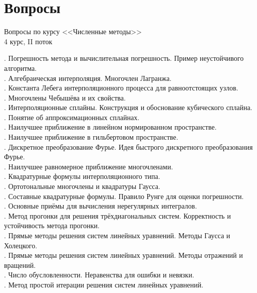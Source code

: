 \documentclass[specialist, subf, href, colorlinks=true, 12pt, times, mtpro, final]{disser}
\theoremstyle{definition}
\begin{document}
\tableofcontents

\section* {Вопросы}
\begin{center}
    Вопросы по курсу <<Численные методы>> \\ 4 курс, II поток
\end{center}
{\small
{}. Погрешность метода и вычислительная погрешность. Пример неустойчивого алгоритма.\\
. Алгебраическая интерполяция. Многочлен Лагранжа.\\
. Константа Лебега интерполяционного процесса для равноотстоящих узлов.\\
. Многочлены Чебышёва и их свойства.\\
. Интерполяционные сплайны. Конструкция и обоснование кубического сплайна.\\
. Понятие об аппроксимационных сплайнах.\\
. Наилучшее приближение в линейном нормированном пространстве.\\
. Наилучшее приближение в гильбертовом пространстве.\\
. Дискретное преобразование Фурье. Идея быстрого дискретного преобразования Фурье.\\
. Наилучшее равномерное приближение многочленами.\\
. Квадратурные формулы интерполяционного типа.\\
. Ортотональные многочлены и квадратуры Гаусса.\\
. Составные квадратурные формулы. Правило Рунге для оценки погрешности.\\
. Основные приёмы для вычисления нерегулярных интегралов.\\
. Метод прогонки для решения трёхдиагональных систем. Корректность и устойчивость метода прогонки.\\
. Прямые методы решения систем линейных уравнений. Методы Гаусса и Холецкого.\\
. Прямые методы решения систем линейных уравнений. Методы отражений и вращений.\\
. Число обусловленности. Неравенства для ошибки и невязки.\\
. Метод простой итерации решения систем линейных уравнений.\\
}
\end{document}
